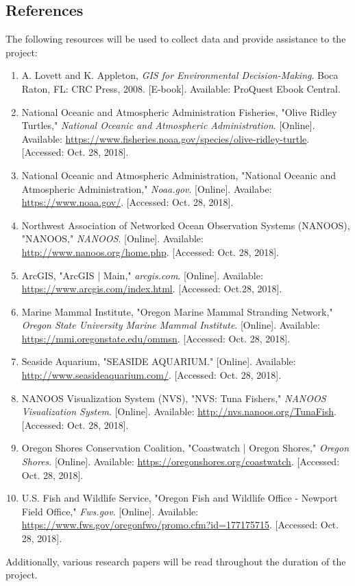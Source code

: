 \documentclass[onecolumn, draftclsnofoot,10pt, compsoc]{IEEEtran}
\begin{document}
\begin{singlespace}
\subsection{References}
The following resources will be used to collect data and provide assistance to the project:
\begin{enumerate}
    \item A. Lovett and K. Appleton, \textit{GIS for Environmental Decision-Making}. Boca Raton, FL: CRC Press, 2008. [E-book]. Available: ProQuest Ebook Central.
    \item National Oceanic and Atmospheric Administration Fisheries, "Olive Ridley Turtles," \textit{National Oceanic and Atmospheric Administration}. [Online]. Available: \url{https://www.fisheries.noaa.gov/species/olive-ridley-turtle}. [Accessed: Oct. 28, 2018].
    \item National Oceanic and Atmospheric Administration, "National Oceanic and Atmospheric Administration," \textit{Noaa.gov}. [Online]. Availabe: \url{https://www.noaa.gov/}. [Accessed: Oct. 28, 2018].
    \item Northwest Association of Networked Ocean Observation Systems (NANOOS), "NANOOS," \textit{NANOOS}. [Online]. Available: \url{http://www.nanoos.org/home.php}. [Accessed: Oct. 28, 2018].
    \item ArcGIS, "ArcGIS | Main," \textit{arcgis.com}. [Online]. Available: \url{https://www.arcgis.com/index.html}. [Accessed: Oct.28, 2018].
    \item Marine Mammal Institute, "Oregon Marine Mammal Stranding Network," \textit{Oregon State University Marine Mammal Institute}. [Online]. Available: \url{https://mmi.oregonstate.edu/ommsn}. [Accessed: Oct. 28, 2018].
    \item Seaside Aquarium, "SEASIDE AQUARIUM." [Online]. Available: \url{http://www.seasideaquarium.com/}. [Accessed: Oct. 28, 2018].
    \item NANOOS Visualization System (NVS), "NVS: Tuna Fishers," \textit{NANOOS Visualization System}. [Online]. Available: \url{http://nvs.nanoos.org/TunaFish}. [Accessed: Oct. 28, 2018].
    \item Oregon Shores Conservation Coalition, "Coastwatch | Oregon Shores," \textit{Oregon Shores}. [Online]. Available: \url{https://oregonshores.org/coastwatch}. [Accessed: Oct. 28, 2018].
    \item U.S. Fish and Wildlife Service, "Oregon Fish and Wildlife Office - Newport Field Office," \textit{Fws.gov}. [Online]. Available: \url{https://www.fws.gov/oregonfwo/promo.cfm?id=177175715}. [Accessed: Oct. 28, 2018].
\end{enumerate}
    Additionally, various research papers will be read throughout the duration of the project.

\end{singlespace}
\end{document}

